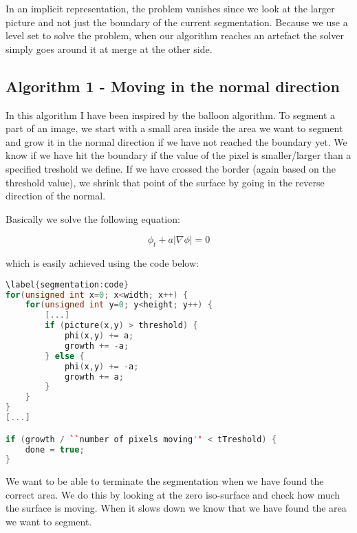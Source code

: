 In an implicit representation, the problem vanishes since we look at the larger picture and not just the boundary of the current segmentation. Because we use a level set to solve the problem, when our algorithm reaches an artefact the solver simply goes around it at merge at the other side.

\subsection{Algorithm 1 - Moving in the normal direction}
\label{segmentation:sec:algorithm1}

In this algorithm I have been inspired by the balloon algorithm. 
To segment a part of an image, we start with a small area inside the area we want to segment and grow it in the normal direction if we have not reached the boundary yet. We know if we have hit the boundary if the value of the pixel is smaller/larger than a specified treshold we define. If we have crossed the border (again based on the threshold value), we shrink that point of the surface by going in the reverse direction of the normal.



Basically we solve the following equation:

\begin{equation}
  \phi_{t} + a|\nabla{\phi}| = 0
\end{equation}

which is easily achieved using the code below: 

\begin{lstlisting}[language=c++]
\label{segmentation:code}
for(unsigned int x=0; x<width; x++) {
    for(unsigned int y=0; y<height; y++) {
        [...]
        if (picture(x,y) > threshold) {
            phi(x,y) += a;
            growth += -a;
        } else {
            phi(x,y) += -a;
            growth += a;
        }
    }
}
[...]

if (growth / ``number of pixels moving'' < tTreshold) {
    done = true;
}
\end{lstlisting}



We want to be able to terminate the segmentation when we have found the correct area. We do this by looking at the zero iso-surface and check how much the surface is moving. When it slows down we know that we have found the area we want to segment.


